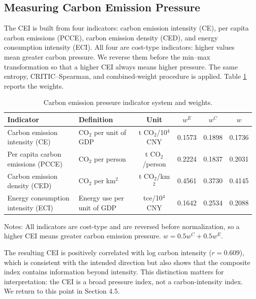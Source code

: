 \documentclass[economies,article,submit,moreauthors]{Definitions/mdpi}
\begin{document}
\subsection{Measuring Carbon Emission Pressure}

The CEI is built from four indicators: carbon emission intensity (CE), per capita carbon emissions (PCCE), carbon emission density (CED), and energy consumption intensity (ECI). All four are cost-type indicators: higher values mean greater carbon pressure. We reverse them before the min--max transformation so that a higher CEI always means higher pressure. The same entropy, CRITIC--Spearman, and combined-weight procedure is applied. Table \ref{tab:cei} reports the weights.

\begin{table}[!htbp]
\centering
\caption{Carbon emission pressure indicator system and weights.}
\label{tab:cei}
\footnotesize
\setlength{\tabcolsep}{3.5pt}
\begin{threeparttable}
\begin{tabular}{llcccc}
\toprule
Indicator & Definition & Unit & $w^{E}$ & $w^{C}$ & $w$\\
\midrule
Carbon emission intensity (CE) & CO$_2$ per unit of GDP & t CO$_2$/10$^4$ CNY & 0.1573 & 0.1898 & 0.1736\\
Per capita carbon emissions (PCCE) & CO$_2$ per person & t CO$_2$/person & 0.2224 & 0.1837 & 0.2031\\
Carbon emission density (CED) & CO$_2$ per km$^2$ & t CO$_2$/km$^2$ & 0.4561 & 0.3730 & 0.4145\\
Energy consumption intensity (ECI) & Energy use per unit of GDP & tce/10$^4$ CNY & 0.1642 & 0.2534 & 0.2088\\
\bottomrule
\end{tabular}
\begin{tablenotes}\footnotesize
\item Notes: All indicators are cost-type and are reversed before normalization, so a higher CEI means greater carbon emission pressure. $w=0.5w^{C}+0.5w^{E}$.
\end{tablenotes}
\end{threeparttable}
\end{table}

The resulting CEI is positively correlated with log carbon intensity ($r=0.609$), which is consistent with the intended direction but also shows that the composite index contains information beyond intensity. This distinction matters for interpretation: the CEI is a broad pressure index, not a carbon-intensity index. We return to this point in Section 4.5.
\end{document}
